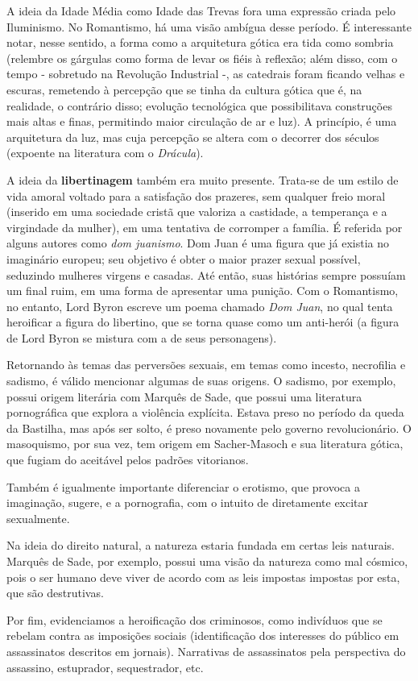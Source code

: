 A ideia da Idade Média como Idade das Trevas fora uma expressão criada pelo Iluminismo. No Romantismo, há uma visão ambígua desse período. É interessante notar, nesse sentido, a forma como a arquitetura gótica era tida como sombria (relembre os gárgulas como forma de levar os fiéis à reflexão; além disso, com o tempo - sobretudo na Revolução Industrial -, as catedrais foram ficando velhas e escuras, remetendo à percepção que se tinha da cultura gótica que é, na realidade, o contrário disso; evolução tecnológica que possibilitava construções mais altas e finas, permitindo maior circulação de ar e luz). A princípio, é uma arquitetura da luz, mas cuja percepção se altera com o decorrer dos séculos (expoente na literatura com o \textit{Drácula}).

A ideia da \textbf{libertinagem} também era muito presente. Trata-se de um estilo de vida amoral voltado para a satisfação dos prazeres, sem qualquer freio moral (inserido em uma sociedade cristã que valoriza a castidade, a temperança e a virgindade da mulher), em uma tentativa de corromper a família. É referida por alguns autores como \textit{dom juanismo}. Dom Juan é uma figura que já existia no imaginário europeu; seu objetivo é obter o maior prazer sexual possível, seduzindo mulheres virgens e casadas. Até então, suas histórias sempre possuíam um final ruim, em uma forma de apresentar uma punição. Com o Romantismo, no entanto, Lord Byron escreve um poema chamado \textit{Dom Juan}, no qual tenta heroificar a figura do libertino, que se torna quase como um anti-herói (a figura de Lord Byron se mistura com a de seus personagens).

Retornando às temas das perversões sexuais, em temas como incesto, necrofilia e sadismo, é válido mencionar algumas de suas origens. O sadismo, por exemplo, possui origem literária com Marquês de Sade, que possui uma literatura pornográfica que explora a violência explícita. Estava preso no período da queda da Bastilha, mas após ser solto, é preso novamente pelo governo revolucionário. O masoquismo, por sua vez, tem origem em Sacher-Masoch e sua literatura gótica, que fugiam do aceitável pelos padrões vitorianos.

Também é igualmente importante diferenciar o erotismo, que provoca a imaginação, sugere, e a pornografia, com o intuito de diretamente excitar sexualmente.

Na ideia do direito natural, a natureza estaria fundada em certas leis naturais. Marquês de Sade, por exemplo, possui uma visão da natureza como mal cósmico, pois o ser humano deve viver de acordo com as leis impostas impostas por esta, que são destrutivas.

Por fim, evidenciamos a heroificação dos criminosos, como indivíduos que se rebelam contra as imposições sociais (identificação dos interesses do público em assassinatos descritos em jornais). Narrativas de assassinatos pela perspectiva do assassino, estuprador, sequestrador, etc.
